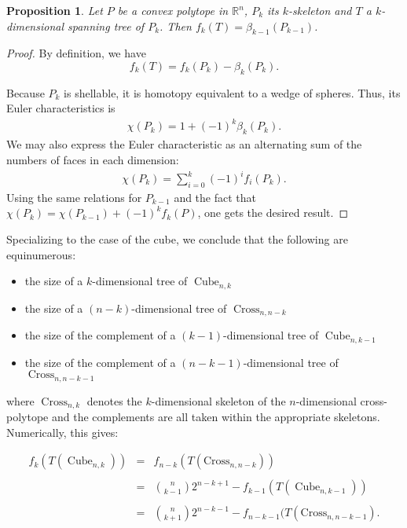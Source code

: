 \documentclass{amsart}
\newcommand{\R}{{\mathbb R}}
\newtheorem{proposition}[theorem]{Proposition}
\DeclareMathOperator{\Cube}{Cube}
\DeclareMathOperator{\Cross}{Cross}
\begin{document}
\begin{proposition}
\label{tree_to_beti}
  Let $P$ be a convex polytope in $\R^n$,  $P_k$  its $k$-skeleton and $T$ a $k$-dimensional spanning tree of $P_k$. Then $f_k(T) = \beta_{k-1}(P_{k-1})$.
\end{proposition}
\begin{proof}
  
  By definition, we have
  $$f_k(T) = f_k(P_k) - \beta_k(P_k).$$

  Because $P_k$ is shellable, it is homotopy equivalent to a wedge of spheres. Thus, its Euler characteristics is
\begin{align*}
  \chi(P_k) = 1 + (-1)^{k} \beta_k(P_k).
\end{align*}
We may also express the Euler characteristic as an alternating sum of the numbers of faces in each dimension:
\begin{align*}
\chi(P_k) = \sum_{i = 0}^{k} (-1)^{i} f_i(P_k).  
\end{align*}
Using the same relations for $P_{k-1}$ and the fact that $\chi(P_k) = \chi(P_{k-1}) + (-1)^{k} f_k(P)$, one gets the desired result.

\end{proof}
Specializing to the case of the cube, we conclude that the following are equinumerous:
\begin{itemize}
\item  the size of a $k$-dimensional tree of $\Cube_{n, k}$
\item the size of a $(n-k)$-dimensional tree of $\Cross_{n, n-k}$ 
\item  the size of the complement of a $(k-1)$-dimensional tree of $\Cube_{n, k-1}$
\item  the size of the complement of a $(n-k-1)$-dimensional tree of $\Cross_{n, n-k-1}$
\end{itemize}
  where $\Cross_{n, k}$ denotes the $k$-dimensional skeleton of the $n$-dimensional cross-polytope and the complements are all taken within the appropriate skeletons.  Numerically, this gives:

\begin{eqnarray*}
f_k(T(\Cube_{n,k})) 
& = & f_{n-k}(T(\textrm{Cross}_{n, n-k})) \\
& & \\
& = & {n \choose {k-1}} 2^{n-k+1} - f_{k-1}(T(\Cube_{n,k-1})) \\
& & \\
& = &  {n \choose k+1} 2^{n-k-1} - f_{n-k-1}(T(\textrm{Cross}_{n, n-k-1}).
\end{eqnarray*}
\end{document}
